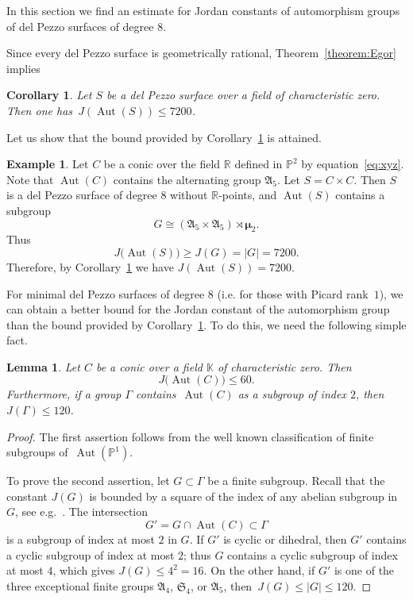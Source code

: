\documentclass[12pt]{amsart}
\newcounter{cequation}[section]
\newtheorem{lemma}[cequation]{Lemma}
\newtheorem{corollary}[cequation]{Corollary}
\theoremstyle{definition}
\newtheorem{example}[cequation]{Example}
\theoremstyle{remark}
\newcommand{\RR}{\mathbb{R}}
\newcommand{\PP}{\mathbb{P}}
\newcommand{\KK}{\mathbb{K}}
\newcommand{\AAA}{\mathfrak{A}}
\newcommand{\mumu}{{\boldsymbol{\mu}}}
\newcommand{\Aut}{\operatorname{Aut}}
\def \ge {\geqslant}
\def \le {\leqslant}
\begin{document}
In this section we find an estimate for Jordan constants
of automorphism groups of del Pezzo surfaces of degree $8$.

Since every del Pezzo surface is geometrically rational,
Theorem~\ref{theorem:Egor} implies

\begin{corollary}\label{corollary:dP8}
Let $S$ be a del Pezzo surface over a field of characteristic
zero. Then one has~\mbox{$J(\Aut(S))\le 7200$}.
\end{corollary}

Let us show that the bound provided by Corollary~\ref{corollary:dP8}
is attained.

\begin{example}\label{example:dP8}
Let $C$ be a conic over the field $\RR$ defined in $\PP^2$
by equation~\eqref{eq:xyz}.
Note that $\Aut(C)$ contains the alternating group $\AAA_5$.
Let $S=C\times C$. Then $S$ is a del Pezzo surface of degree $8$
without $\RR$-points, and
$\Aut(S)$ contains a subgroup
$$
G\cong (\AAA_5\times\AAA_5)\rtimes\mumu_2.
$$
Thus
$$
J\big(\Aut(S)\big)\ge J(G)=|G|=7200.
$$
Therefore, by Corollary~\ref{corollary:dP8} we have $J(\Aut(S))=7200$.
\end{example}


For minimal del Pezzo surfaces of degree $8$ (i.e. for those
with Picard rank~$1$), we can
obtain a better bound for the Jordan constant of the automorphism group
than the bound provided by Corollary~\ref{corollary:dP8}.
To do this, we need the following simple fact.

\begin{lemma}\label{lemma:P1}
Let $C$ be a conic over a field $\KK$ of characteristic zero. Then
$$
J\big(\Aut(C)\big)\le 60.
$$
Furthermore,
if a group $\Gamma$ contains~\mbox{$\Aut(C)$} as a subgroup of index $2$,
then~\mbox{$J(\Gamma)\le 120$}.
\end{lemma}

\begin{proof}
The first assertion follows from  the well known classification of finite
subgroups of~\mbox{$\Aut(\PP^1)$}.

To prove the second assertion, let $G\subset \Gamma$ be a finite subgroup.
Recall that the constant $J(G)$ is bounded by a square of the index of any abelian subgroup
in~$G$, see e.g.~\mbox{\cite[Theorem~1.41]{Isaacs}}.
The intersection
$$
G'=G\cap \Aut(C)\subset \Gamma
$$
is a subgroup of index at most $2$ in $G$.
If $G'$ is cyclic or dihedral, then $G'$ contains a cyclic subgroup of index at most $2$;
thus $G$ contains a cyclic subgroup of index at most $4$, which gives
$J(G)\le 4^2=16$. On the other hand,
if $G'$ is one of the three exceptional finite groups
$\mathfrak{A}_4$, $\mathfrak{S}_4$, or $\mathfrak{A}_5$,
then~\mbox{$J(G)\le |G|\le 120$}. 
\end{proof}
\end{document}

